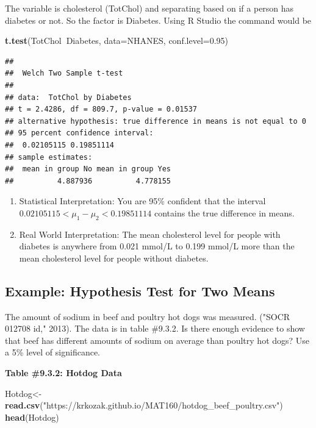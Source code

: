 \documentclass[
]{book}
\newenvironment{Shaded}{\begin{snugshade}}{\end{snugshade}}
\newcommand{\DataTypeTok}[1]{\textcolor[rgb]{0.13,0.29,0.53}{#1}}
\newcommand{\FloatTok}[1]{\textcolor[rgb]{0.00,0.00,0.81}{#1}}
\newcommand{\KeywordTok}[1]{\textcolor[rgb]{0.13,0.29,0.53}{\textbf{#1}}}
\newcommand{\NormalTok}[1]{#1}
\newcommand{\OperatorTok}[1]{\textcolor[rgb]{0.81,0.36,0.00}{\textbf{#1}}}
\newcommand{\StringTok}[1]{\textcolor[rgb]{0.31,0.60,0.02}{#1}}
\begin{document}
The variable is cholesterol (TotChol) and separating based on if a person has diabetes or not. So the factor is Diabetes. Using R Studio the command would be

\begin{Shaded}
\begin{Highlighting}[]
\KeywordTok{t.test}\NormalTok{(TotChol}\OperatorTok{~}\NormalTok{Diabetes, }\DataTypeTok{data=}\NormalTok{NHANES, }\DataTypeTok{conf.level=}\FloatTok{0.95}\NormalTok{)}
\end{Highlighting}
\end{Shaded}

\begin{verbatim}
## 
##  Welch Two Sample t-test
## 
## data:  TotChol by Diabetes
## t = 2.4286, df = 809.7, p-value = 0.01537
## alternative hypothesis: true difference in means is not equal to 0
## 95 percent confidence interval:
##  0.02105115 0.19851114
## sample estimates:
##  mean in group No mean in group Yes 
##          4.887936          4.778155
\end{verbatim}

\begin{enumerate}
\def\labelenumi{\arabic{enumi}.}
\setcounter{enumi}{3}
\item
  Statistical Interpretation: You are 95\% confident that the interval \(0.02105115<\mu_1-\mu_2<0.19851114\) contains the true difference in means.
\item
  Real World Interpretation: The mean cholesterol level for people with diabetes is anywhere from 0.021 mmol/L to 0.199 mmol/L more than the mean cholesterol level for people without diabetes.
\end{enumerate}

\hypertarget{example-hypothesis-test-for-two-means-1}{%
\subsection{Example: Hypothesis Test for Two Means}\label{example-hypothesis-test-for-two-means-1}}

The amount of sodium in beef and poultry hot dogs was measured. ("SOCR 012708 id," 2013). The data is in table \#9.3.2. Is there enough evidence to show that beef has different amounts of sodium on average than poultry hot dogs? Use a 5\% level of significance.

\textbf{Table \#9.3.2: Hotdog Data}

\begin{Shaded}
\begin{Highlighting}[]
\NormalTok{Hotdog<-}\KeywordTok{read.csv}\NormalTok{(}\StringTok{"https://krkozak.github.io/MAT160/hotdog_beef_poultry.csv"}\NormalTok{)}
\KeywordTok{head}\NormalTok{(Hotdog)}
\end{Highlighting}
\end{Shaded}
\end{document}
